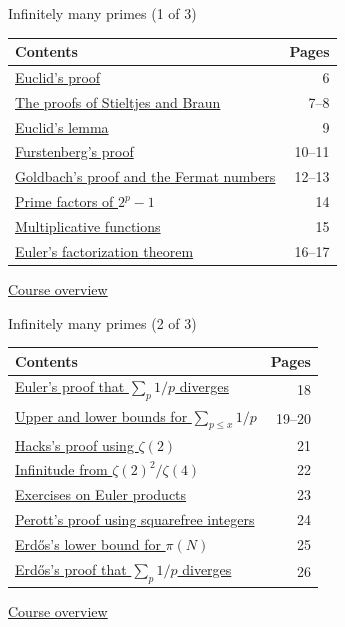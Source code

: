 \documentclass[aspectratio=169,11pt]{beamer}
\begin{document}
\begin{frame}{Infinitely many primes (1 of 3)}
\small\renewcommand{\arraystretch}{1.35}
\begin{tabular}{p{}r}\textbf{Contents}&\textbf{Pages}\\\midrule
\hyperlink{Navigation6}{Euclid's proof}&6\\
\hyperlink{Navigation7}{The proofs of Stieltjes and Braun}&7--8\\
\hyperlink{Navigation9}{Euclid's lemma}&9\\
\hyperlink{Navigation10}{Furstenberg's proof}&10--11\\
\hyperlink{Navigation12}{Goldbach's proof and the Fermat numbers}&12--13\\
\hyperlink{Navigation14}{Prime factors of $2^p-1$}&14\\
\hyperlink{Navigation15}{Multiplicative functions}&15\\
\hyperlink{Navigation16}{Euler's factorization theorem}&16--17\\
\end{tabular}\par\medskip\hyperlink{overview}{\color{teal}Course overview}\end{frame}


\begin{frame}{Infinitely many primes (2 of 3)}
\small\renewcommand{\arraystretch}{1.35}
\begin{tabular}{p{}r}\textbf{Contents}&\textbf{Pages}\\\midrule
\hyperlink{Navigation18}{Euler's proof that $\sum_p1/p$ diverges}&18\\
\hyperlink{Navigation19}{Upper and lower bounds for $\sum_{p\le x}1/p$}&19--20\\
\hyperlink{Navigation21}{Hacks's proof using $\zeta(2)$}&21\\
\hyperlink{Navigation22}{Infinitude from $\zeta(2)^2/\zeta(4)$}&22\\
\hyperlink{Navigation23}{Exercises on Euler products}&23\\
\hyperlink{Navigation24}{Perott's proof using squarefree integers}&24\\
\hyperlink{Navigation25}{Erd\H{o}s's lower bound for $\pi(N)$}&25\\
\hyperlink{Navigation26}{Erd\H{o}s's proof that $\sum_p1/p$ diverges}&26\\
\end{tabular}\par\medskip\hyperlink{overview}{\color{teal}Course overview}\end{frame}
\end{document}
